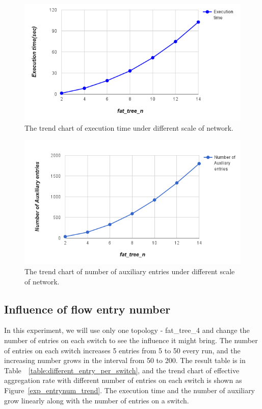 \begin{figure}[H]
\begin{center} 
\includegraphics[width=1\textwidth]{figures/exp_scale_time_trend.png}
\end{center}
\caption{The trend chart of execution time under different scale of network.}
\label{different_scale_time_trend}
\end{figure}

\begin{figure}[H]
\begin{center} 
\includegraphics[width=1\textwidth]{figures/exp_scale_aux_trend.png}
\end{center}
\caption{The trend chart of number of auxiliary entries under different scale of network.}
\label{different_scale_aux_trend}
\end{figure}

\subsection{Influence of flow entry number}
In this experiment, we will use only one topology - fat\_tree\_4 and change the number of entries on each switch to see the influence it might bring. The number of entries on each switch increases 5 entries from 5 to 50 every run, and the increasing number grows in the interval from 50 to 200. The result table is in Table~~\ref{table:different_entry_per_switch}, and the trend chart of effective aggregation rate with different number of entries on each switch is shown as Figure~\ref{exp_entrynum_trend}. The execution time and the number of auxiliary grow linearly along with the number of entries on a switch.

